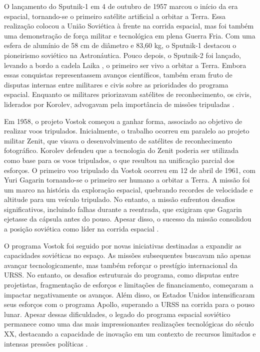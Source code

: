 O lançamento do Sputnik-1 em 4 de outubro de 1957 \cite{nasaSputnik1} marcou o início da era espacial, tornando-se o primeiro satélite artificial a orbitar a Terra. Essa realização colocou a União Soviética à frente na corrida espacial, mas foi também uma demonstração de força militar e tecnológica em plena Guerra Fria. Com uma esfera de alumínio de 58 cm de diâmetro e 83,60 kg, o Sputnik-1 destacou o pioneirismo soviético na Astronáutica. Pouco depois, o Sputnik-2 foi lançado, levando a bordo a cadela Laika \cite{nasaSputnik2} , o primeiro ser vivo a orbitar a Terra. Embora essas conquistas representassem avanços científicos, também eram fruto de disputas internas entre militares e civis sobre as prioridades do programa espacial. Enquanto os militares priorizavam satélites de reconhecimento, os civis, liderados por Korolev, advogavam pela importância de missões tripuladas \cite{betzler2024}.

Em 1958, o projeto Vostok \cite{nasaVostok1} começou a ganhar forma, associado ao objetivo de realizar voos tripulados. Inicialmente, o trabalho ocorreu em paralelo ao projeto militar Zenit, que visava o desenvolvimento de satélites de reconhecimento fotográfico. Korolev defendeu que a tecnologia do Zenit \cite{astronautixZenit} poderia ser utilizada como base para os voos tripulados, o que resultou na unificação parcial dos esforços. O primeiro voo tripulado da Vostok ocorreu em 12 de abril de 1961, com Yuri Gagarin tornando-se o primeiro ser humano a orbitar a Terra. A missão foi um marco na história da exploração espacial, quebrando recordes de velocidade e altitude para um veículo tripulado. No entanto, a missão enfrentou desafios significativos, incluindo falhas durante a reentrada, que exigiram que Gagarin ejetasse da cápsula antes do pouso. Apesar disso, o sucesso da missão consolidou a posição soviética como líder na corrida espacial \cite{betzler2024}.

O programa Vostok foi seguido por novas iniciativas destinadas a expandir as capacidades soviéticas no espaço. As missões subsequentes buscavam não apenas avançar tecnologicamente, mas também reforçar o prestígio internacional da URSS. No entanto, os desafios estruturais do programa, como disputas entre projetistas, fragmentação de esforços e limitações de financiamento, começaram a impactar negativamente os avanços. Além disso, os Estados Unidos intensificaram seus esforços com o programa Apollo, superando a URSS na corrida para o pouso lunar. Apesar dessas dificuldades, o legado do programa espacial soviético permanece como uma das mais impressionantes realizações tecnológicas do século XX, destacando a capacidade de inovação em um contexto de recursos limitados e intensas pressões políticas \cite{betzler2024}.

